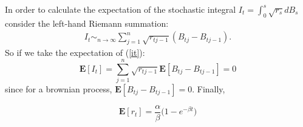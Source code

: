 \documentclass[12pt]{article}
\begin{document}
In order to  calculate the expectation of the stochastic integral $I_t = \int_0^s \sqrt{r_s}dB_s$ consider the left-hand Riemann summation:
\begin{align}\label{it}
I_t \sim_{n \rightarrow \infty} \sum_{j=1}^{n} \sqrt{r_{tj-1}}(B_{tj}-B_{tj-1}).
\end{align}
So if we take the expectation of (\ref{it}): 
\begin{equation}
\mathbf{E}[I_t] = \sum_{j=1}^{n} \sqrt{r_{tj-1}}\mathbf{E}[B_{tj}-B_{tj-1}] = 0
\end{equation}
since for a brownian process, $\mathbf{E}[B_{tj}-B_{tj-1}] = 0$.  Finally, 

\begin{equation}
\mathbf{E}[r_t]  = \frac{\alpha}{\beta} \bigg(1-e^{-\beta t}\bigg)
\end{equation}
\end{document}
